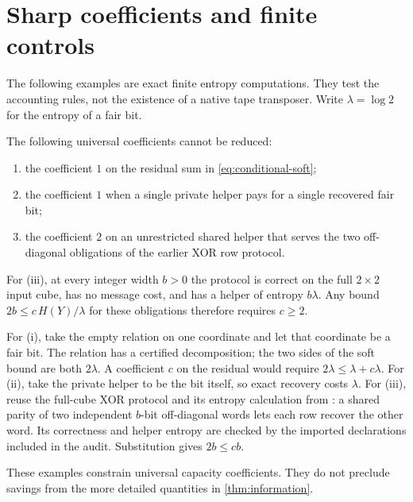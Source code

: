 \section{Sharp coefficients and finite controls}\label{sec:sharpness}

The following examples are exact finite entropy computations. They
test the accounting rules, not the existence of a native tape
transposer. Write $\lambda=\log 2$ for the entropy of a fair bit.

\begin{proposition}\label{prop:coefficients}
The following universal coefficients cannot be reduced:
\begin{enumerate}[label=(\roman*)]
\item the coefficient $1$ on the residual sum in
\eqref{eq:conditional-soft};
\item the coefficient $1$ when a single private helper pays for a
single recovered fair bit;
\item the coefficient $2$ on an unrestricted shared helper that
serves the two off-diagonal obligations of the earlier XOR row protocol.
\end{enumerate}
For (iii), at every integer width $b>0$ the protocol is correct on the
full $2\times2$ input cube, has no message cost, and has a helper of
entropy $b\lambda$. Any bound $2b\le c\,H(Y)/\lambda$ for these
obligations therefore requires $c\ge2$.
\end{proposition}
\begin{outline}
For (i), take the empty relation on one coordinate and let that
coordinate be a fair bit. The relation has a certified decomposition;
the two sides of the soft bound are both $2\lambda$. A coefficient
$c$ on the residual would require $2\lambda\le\lambda+c\lambda$.
For (ii), take the private helper to be the bit itself, so exact recovery
costs $\lambda$. For (iii), reuse the full-cube XOR protocol and its
entropy calculation from \cite{SecondPaper2026}: a shared parity of
two independent $b$-bit off-diagonal words lets each row recover the
other word. Its correctness and helper entropy are checked by the
imported  declarations
included in the audit. Substitution gives $2b\le cb$.
\end{outline}
These examples constrain universal capacity coefficients. They do not
preclude savings from the more detailed quantities in
\cref{thm:information}.

